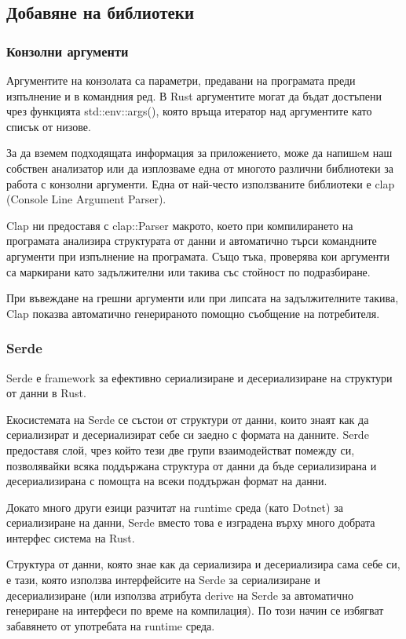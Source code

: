\subsection{Добавяне на библиотеки}

\subsubsection{Конзолни аргументи}
Аргументите на конзолата са параметри, предавани на програмата преди изпълнение
и в командния ред. В Rust аргументите могат да бъдат достъпени чрез
функцията std::env::args(), която връща итератор над аргументите като списък от
низове.

За да вземем подходящата информация за приложението, може да напишeм наш собствен
анализатор или да изплозваме една от многото различни библиотеки за работа с
конзолни аргументи. Една от най-често използваните библиотеки е clap (Console Line
Argument Parser).

Clap ни предоставя с clap::Parser макрото, което при компилирането на програмата
анализира структурата от данни и автоматично търси командните аргументи при
изпълнение на програмата. Също тъка, проверява кои аргументи са маркирани като
задължителни или такива със стойност по подразбиране.

При въвеждане на грешни аргументи или при липсата на задължителните такива, Clap
показва автоматично генерираното помощно съобщение на потребителя.


\subsubsection{Serde}
Serde е framework за ефективно сериализиране и десериализиране на структури от данни в Rust.

Екосистемата на Serde се състои от структури от данни, които знаят как да
сериализират и десериализират себе си заедно с формата на данните. Serde предоставя слой, чрез
който тези две групи взаимодействат помежду си, позволявайки всяка поддържана
структура от данни да бъде сериализирана и десериализирана с помощта на всеки
поддържан формат на данни.

Докато много други езици разчитат на runtime среда (като Dotnet) за
сериализиране на данни, Serde вместо това е изградена върху много добрата
интерфес система на Rust.

Структура от данни, която знае как да сериализира и десериализира сама себе си,
е тази, която използва интерфейсите на Serde за сериализиране и десериализиране
(или използва атрибута derive на Serde за автоматично генериране на интерфеси
по време на компилация). По този начин се избягват забавянето от употребата на
runtime среда.

